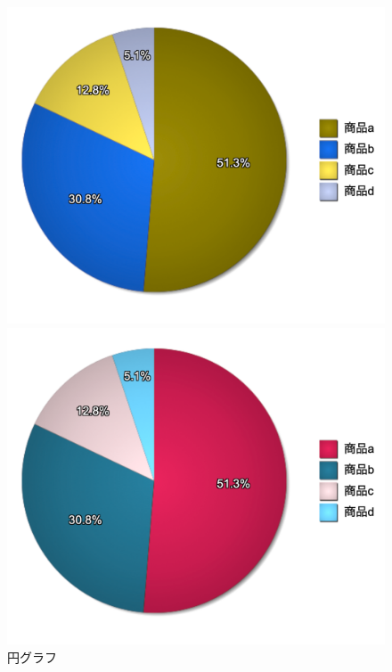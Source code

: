 \begin{figure}[H]
\begin{minipage}[b]{.30\textwidth}
    \end{minipage}
    \begin{minipage}[b]{.30\textwidth}
        \centering
        \includegraphics[keepaspectratio,width=\textwidth]{../../10_UniversalDesign/no2_circle_RC_D.png}
    \end{minipage}
    \begin{minipage}[b]{.30\textwidth}
        \centering
        \includegraphics[keepaspectratio,width=\textwidth]{../../10_UniversalDesign/no2_circle_RC_T.png}
    \end{minipage}
    \caption{円グラフ}
\end{figure}